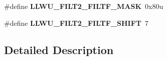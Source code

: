 \begin{DoxyCompactItemize}
\item 
\hypertarget{group___l_l_w_u___register___masks_gab60be1393d84433fe44d4b332a77537c}{}\#define {\bfseries L\+L\+W\+U\+\_\+\+F\+I\+L\+T2\+\_\+\+F\+I\+L\+T\+F\+\_\+\+M\+A\+S\+K}~0x80u\label{group___l_l_w_u___register___masks_gab60be1393d84433fe44d4b332a77537c}

\item 
\hypertarget{group___l_l_w_u___register___masks_ga20b3ccaef11cade3a0dc88b3a378b790}{}\#define {\bfseries L\+L\+W\+U\+\_\+\+F\+I\+L\+T2\+\_\+\+F\+I\+L\+T\+F\+\_\+\+S\+H\+I\+F\+T}~7\label{group___l_l_w_u___register___masks_ga20b3ccaef11cade3a0dc88b3a378b790}

\end{DoxyCompactItemize}


\subsection{Detailed Description}
